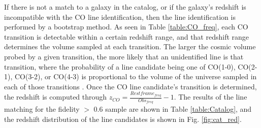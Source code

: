If there is not a match to a galaxy in the catalog, or if the galaxy's redshift is incompatible with the CO line identification, then the line identification is performed by a bootstrap method. As seen in Table \ref{table:CO_freq}, each CO transition is detectable within a certain redshift range, and that redshift range determines the volume sampled at each transition. The larger the cosmic volume probed by a given transition, the more likely that an unidentified line is that transition, where the probability of a line candidate being one of CO(1-0), CO(2-1), CO(3-2), or CO(4-3) is proportional to the volume of the universe sampled in each of those transitions \cite{walter2016alma, decarli2019alma}. Once the CO line candidate's transition is determined, the redshift is computed through $ z_{CO} = \frac{Restframe_{freq}}{Obs_{freq}} - 1 $. The results of the line matching for the fidelity $>$ 0.6 sample are shown in Table \ref{table:Catalog}, and the redshift distribution of the line candidates is shown in Fig. \ref{fig:cat_red}.

